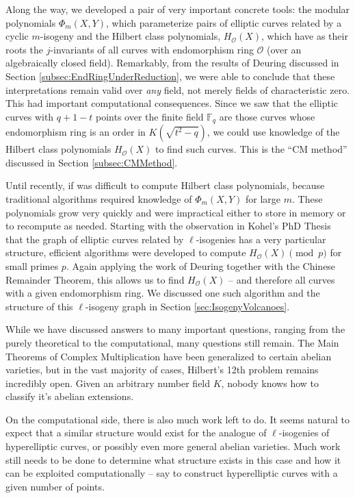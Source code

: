 \documentclass{amsart}
\theoremstyle{definition}
\theoremstyle{remark}
\numberwithin{equation}{section}
\newcommand{\cO}{\mathcal O}
\newcommand{\bbF}{\mathbb F}
\begin{document}
Along the way, we developed a pair of very important concrete tools: the modular polynomials $\Phi_{m}(X,Y)$, which parameterize pairs of elliptic curves related by a cyclic $m$-isogeny and the Hilbert class polynomials, $H_{\cO}(X)$, which have as their roots the $j$-invariants of all curves with endomorphism ring $\cO$ (over an algebraically closed field). Remarkably, from the results of Deuring discussed in Section \ref{subsec:EndRingUnderReduction}, we were able to conclude that these interpretations remain valid over \emph{any} field, not merely fields of characteristic zero. This had important computational consequences. Since we saw that the elliptic curves with $q + 1 - t$ points over the finite field $\bbF_{q}$ are those curves whose endomorphism ring is an order in $K(\sqrt{t^2 - q})$, we could use knowledge of the Hilbert class polynomials $H_{\cO}(X)$ to find such curves. This is the ``CM method'' discussed in Section \ref{subsec:CMMethod}.

 Until recently, if was difficult to compute Hilbert class polynomials, because traditional algorithms required knowledge of $\Phi_{m}(X,Y)$ for large $m$. These polynomials grow very quickly and were impractical either to store in memory or to recompute as needed. Starting with the observation in Kohel's PhD Thesis \cite{KohelThesis} that the graph of elliptic curves related by $\ell$-isogenies has a very particular structure, efficient algorithms were developed to compute $H_{\cO}(X) \pmod{p}$ for small primes $p$. Again applying the work of Deuring together with the Chinese Remainder Theorem, this allows us to find $H_{\cO}(X)$  -- and therefore all curves with a given endomorphism ring. We discussed one such algorithm and the structure of this $\ell$-isogeny graph in Section \ref{sec:IsogenyVolcanoes}.
 
 While we have discussed answers to many important questions, ranging from the purely theoretical to the computational, many questions still remain. The Main Theorems of Complex Multiplication have been generalized to certain abelian varieties, but in the vast majority of cases, Hilbert's 12th problem remains incredibly open. Given an arbitrary number field $K$, nobody knows how to classify it's abelian extensions.
 
 On the computational side, there is also much work left to do. It seems natural to expect that a similar structure would exist for the analogue of $\ell$-isogenies of hyperelliptic curves, or possibly even more general abelian varieties. Much work still needs to be done to determine what structure exists in this case and how it can be exploited computationally -- say to construct hyperelliptic curves with a given number of points.
 
\end{document}
